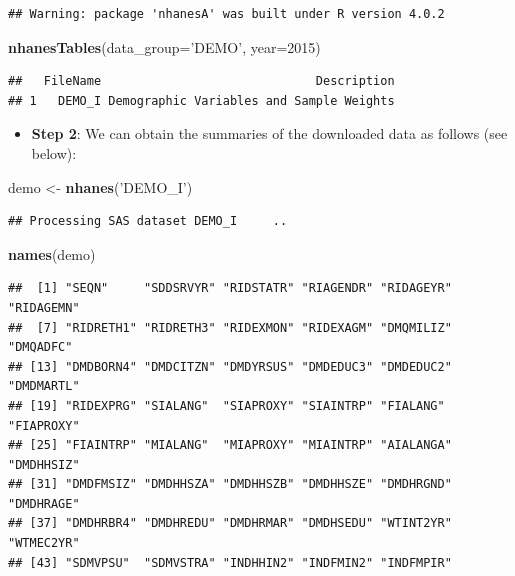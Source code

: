 \documentclass[
]{book}
\newenvironment{Shaded}{\begin{snugshade}}{\end{snugshade}}
\newcommand{\DataTypeTok}[1]{\textcolor[rgb]{0.13,0.29,0.53}{#1}}
\newcommand{\DecValTok}[1]{\textcolor[rgb]{0.00,0.00,0.81}{#1}}
\newcommand{\KeywordTok}[1]{\textcolor[rgb]{0.13,0.29,0.53}{\textbf{#1}}}
\newcommand{\NormalTok}[1]{#1}
\newcommand{\StringTok}[1]{\textcolor[rgb]{0.31,0.60,0.02}{#1}}
\providecommand{\tightlist}{%
  \setlength{\itemsep}{0pt}\setlength{\parskip}{0pt}}
\begin{document}
\begin{verbatim}
## Warning: package 'nhanesA' was built under R version 4.0.2
\end{verbatim}

\begin{Shaded}
\begin{Highlighting}[]
\KeywordTok{nhanesTables}\NormalTok{(}\DataTypeTok{data_group=}\StringTok{'DEMO'}\NormalTok{, }\DataTypeTok{year=}\DecValTok{2015}\NormalTok{)}
\end{Highlighting}
\end{Shaded}

\begin{verbatim}
##   FileName                              Description
## 1   DEMO_I Demographic Variables and Sample Weights
\end{verbatim}

\begin{itemize}
\tightlist
\item
  \textbf{Step 2}: We can obtain the summaries of the downloaded data as follows (see below):
\end{itemize}

\begin{Shaded}
\begin{Highlighting}[]
\NormalTok{demo <-}\StringTok{ }\KeywordTok{nhanes}\NormalTok{(}\StringTok{'DEMO_I'}\NormalTok{)}
\end{Highlighting}
\end{Shaded}

\begin{verbatim}
## Processing SAS dataset DEMO_I 	 ..
\end{verbatim}

\begin{Shaded}
\begin{Highlighting}[]
\KeywordTok{names}\NormalTok{(demo)}
\end{Highlighting}
\end{Shaded}

\begin{verbatim}
##  [1] "SEQN"     "SDDSRVYR" "RIDSTATR" "RIAGENDR" "RIDAGEYR" "RIDAGEMN"
##  [7] "RIDRETH1" "RIDRETH3" "RIDEXMON" "RIDEXAGM" "DMQMILIZ" "DMQADFC" 
## [13] "DMDBORN4" "DMDCITZN" "DMDYRSUS" "DMDEDUC3" "DMDEDUC2" "DMDMARTL"
## [19] "RIDEXPRG" "SIALANG"  "SIAPROXY" "SIAINTRP" "FIALANG"  "FIAPROXY"
## [25] "FIAINTRP" "MIALANG"  "MIAPROXY" "MIAINTRP" "AIALANGA" "DMDHHSIZ"
## [31] "DMDFMSIZ" "DMDHHSZA" "DMDHHSZB" "DMDHHSZE" "DMDHRGND" "DMDHRAGE"
## [37] "DMDHRBR4" "DMDHREDU" "DMDHRMAR" "DMDHSEDU" "WTINT2YR" "WTMEC2YR"
## [43] "SDMVPSU"  "SDMVSTRA" "INDHHIN2" "INDFMIN2" "INDFMPIR"
\end{verbatim}
\end{document}
